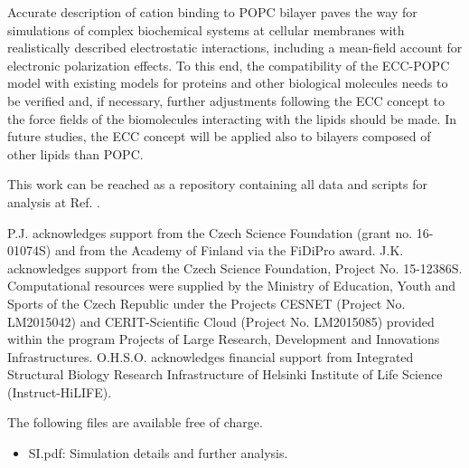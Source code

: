 \documentclass[journal=jpcbfk,manuscript=article]{achemso}
\begin{document}
Accurate description of cation binding to POPC bilayer paves the way for simulations of complex biochemical systems at cellular membranes with realistically described electrostatic interactions, including a mean-field account for electronic polarization effects. To this end, the compatibility of the ECC-POPC model with existing models for proteins and other biological molecules needs to be verified and, if necessary, further adjustments following the ECC concept to the force fields of the biomolecules interacting with the lipids should be made.
In future studies, the ECC concept will be applied also to bilayers composed of other lipids than POPC.


This work can be reached as a repository containing all data and scripts for analysis at Ref. .


\begin{acknowledgement}
P.J. acknowledges support from the Czech Science Foundation (grant no. 16-01074S) 
and from the Academy of Finland via the FiDiPro award.
J.K. acknowledges support from the Czech Science Foundation, Project No. 15-12386S.
Computational resources were supplied by the Ministry of Education, Youth and Sports
of the Czech Republic under the Projects CESNET (Project No. LM2015042) and CERIT-Scientific
Cloud (Project No. LM2015085) provided within the program Projects of Large Research,
Development and Innovations Infrastructures.
O.H.S.O. acknowledges financial support from
Integrated Structural Biology Research Infrastructure of
Helsinki Institute of Life Science (Instruct-HiLIFE).
\end{acknowledgement}

\begin{suppinfo}


The following files are available free of charge.
\begin{itemize}
  \item SI.pdf: Simulation details and further analysis.
\end{itemize}

\end{suppinfo}



\end{document}
